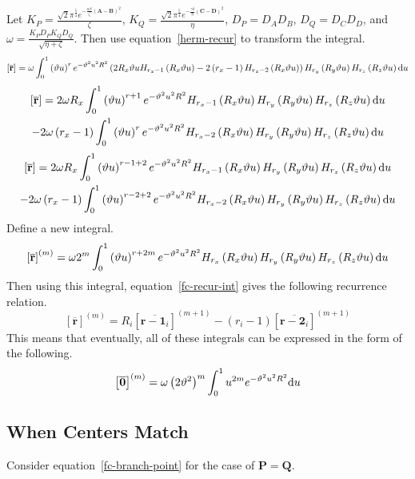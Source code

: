 Let $K_P = \frac{\sqrt{2} \pi^{\frac{5}{4}} e^{-\frac{\alpha\beta}{\zeta}\left(\mathbf{A} - \mathbf{B}\right)^2}}{\zeta}$, $K_Q = \frac{\sqrt{2} \pi^{\frac{5}{4}} e^{-\frac{\gamma\delta}{\eta}\left(\mathbf{C} - \mathbf{D}\right)^2}}{\eta}$, $D_P = D_A D_B$, $D_Q = D_C D_D$, and $\omega = \frac{K_PD_P K_Q D_Q}{\sqrt{\eta + \zeta}}$. Then use equation~\ref{herm-recur} to transform the integral.
\begin{equation}
  \left[\overline{\mathbf{r}}\right] = \omega \int_0^1 \left(\vartheta u\right)^r e^{-\vartheta^2 u^2 R^2} \left(2R_x\vartheta u H_{r_x - 1}\left(R_x\vartheta u\right) - 2\left(r_x - 1\right) H_{r_x - 2}\left(R_x \vartheta u\right)\right) H_{r_y}\left(R_y \vartheta u\right) H_{r_z}\left(R_z \vartheta u\right) \mathrm{d} u
\end{equation}
\begin{multline}
  \left[\overline{\mathbf{r}}\right] = 2\omega R_x \int_0^1 \left(\vartheta u\right)^{r + 1} e^{-\vartheta^2 u^2 R^2} H_{r_x - 1}\left(R_x \vartheta u\right) H_{r_y}\left(R_y \vartheta u\right) H_{r_z}\left(R_z \vartheta u\right) \mathrm{d} u \\
  - 2\omega \left(r_x - 1\right) \int_0^1 \left(\vartheta u\right)^{r} e^{-\vartheta^2 u^2 R^2} H_{r_x - 2}\left(R_x \vartheta u\right) H_{r_y}\left(R_y \vartheta u\right) H_{r_z}\left(R_z \vartheta u\right) \mathrm{d} u
\end{multline}
\begin{multline}
  \left[\overline{\mathbf{r}}\right] = 2\omega R_x \int_0^1 \left(\vartheta u\right)^{r - 1 + 2} e^{-\vartheta^2 u^2 R^2} H_{r_x - 1}\left(R_x \vartheta u\right) H_{r_y}\left(R_y \vartheta u\right) H_{r_z}\left(R_z \vartheta u\right) \mathrm{d} u \\
  - 2\omega \left(r_x - 1\right) \int_0^1 \left(\vartheta u\right)^{r - 2 + 2} e^{-\vartheta^2 u^2 R^2} H_{r_x - 2}\left(R_x \vartheta u\right) H_{r_y}\left(R_y \vartheta u\right) H_{r_z}\left(R_z \vartheta u\right) \mathrm{d} u
  \label{fc-recur-int}
\end{multline}
Define a new integral.
\begin{equation}
  \left[\overline{\mathbf{r}}\right]^{(m)} = \omega 2^m \int_0^1 \left(\vartheta u\right)^{r + 2m} e^{-\vartheta^2 u^2 R^2} H_{r_x}\left(R_x \vartheta u\right) H_{r_y}\left(R_y \vartheta u\right) H_{r_z}\left(R_z \vartheta u\right) \mathrm{d} u
\end{equation}
Then using this integral, equation~\ref{fc-recur-int} gives the following recurrence relation.
\begin{equation}
  \left[\overline{\mathbf{r}}\right]^{(m)} = R_i\left[\overline{\mathbf{r} - \mathbf{1}_i}\right]^{(m + 1)} - \left(r_i - 1\right)\left[\overline{\mathbf{r} - \mathbf{2}_i}\right]^{(m + 1)}
  \label{fc-recur-not-int}
\end{equation}
This means that eventually, all of these integrals can be expressed in the form of the following.
\begin{equation}
  \left[\overline{\mathbf{0}}\right]^{(m)} = \omega \left(2\vartheta^2\right)^{m} \int_0^1 u^{2m} e^{-\vartheta^2 u^2 R^2} \mathrm{d} u
\end{equation}

\subsection{When Centers Match}

Consider equation~\ref{fc-branch-point} for the case of $\mathbf{P} = \mathbf{Q}$. 


  
